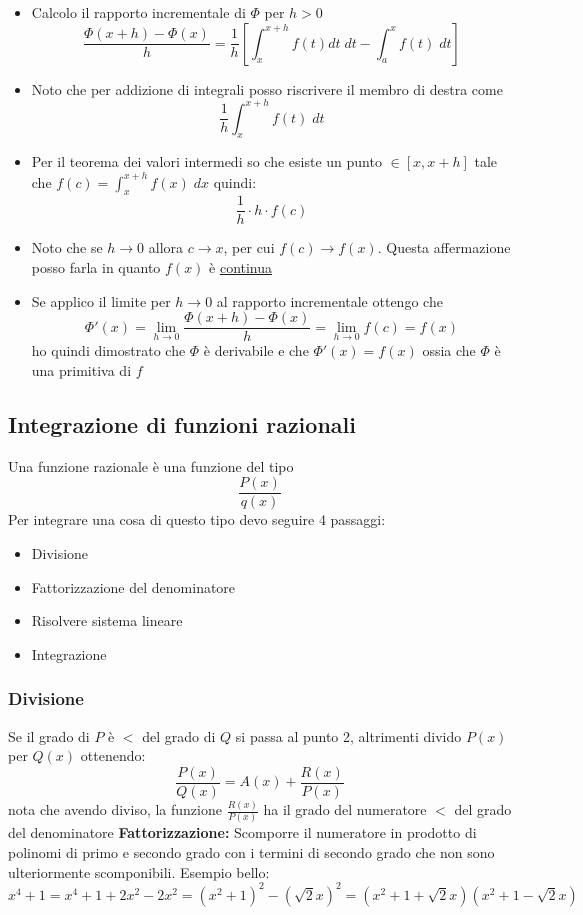 \begin{itemize}
	\item Calcolo il rapporto incrementale di $  \Phi  $ per $ h > 0  $
	      \[
		      \frac{\Phi \left( x+h \right) - \Phi \left( x \right) }{h}= \frac{1}{h}\left[ \int_{x}^{x+h} f\left( t \right) dt \; dt - \int_{a}^{x} f\left( t \right)  \; dt \right]
	      \]
	\item Noto che per addizione di integrali posso riscrivere il membro di destra come
	      \[
		      \frac{1}{h} \int_{x}^{x+h} f(t) \; dt
	      \]
	\item Per il teorema dei valori intermedi so che esiste un punto $ \in \left[ x, x+h \right]  $ tale che $  f\left( c \right) = \int_{x}^{x+h} f\left( x \right)  \; dx$ quindi:
	      \[
		      \frac{1}{h} \cdot h \cdot f\left( c \right)
	      \]
	\item Noto che se $ h \to 0 $ allora $  c \to x $, per cui $ f\left( c \right) \to f\left( x \right)  $. Questa affermazione posso farla in quanto $  f\left( x \right)  $ è \underline{continua}
	\item Se applico il limite per $ h \to 0 $ al rapporto incrementale ottengo che
	      \[
		      \Phi '\left( x \right) = \lim_{h \to 0} \frac{\Phi \left( x+h \right) -\Phi \left( x \right) }{h} = \lim_{h \to 0} f\left( c \right) = f\left( x \right)
	      \]
	      ho quindi dimostrato che $ \Phi  $ è derivabile e che $ \Phi '\left( x \right)  = f\left( x \right) $ ossia che $ \Phi  $ è una primitiva di $ f $
\end{itemize}
\subsection{Integrazione di funzioni razionali}
Una funzione razionale è una funzione del tipo
\[
	\frac{P\left( x \right) }{q\left( x \right) }
\]
Per integrare una cosa di questo tipo devo seguire 4 passaggi:
\begin{itemize}
	\item Divisione
	\item Fattorizzazione del denominatore
	\item Risolvere sistema lineare
	\item Integrazione
\end{itemize}
\subsubsection*{Divisione} Se il grado di $ P $ è $ < $ del grado di $ Q $ si passa al punto 2, altrimenti divido $ P\left( x \right)  $ per $  Q\left( x \right)  $ ottenendo:
\[
	\frac{P\left( x \right) }{Q\left( x \right) }= A\left( x \right) + \frac{R\left( x \right) }{P\left( x \right) }
\]
nota che avendo diviso, la funzione $ \frac{R\left( x \right)}{P\left( x \right) }  $ ha il grado del numeratore $ < $ del grado del denominatore
\vskip3mm
\textbf{Fattorizzazione:} Scomporre il numeratore in prodotto di polinomi di primo e secondo grado con i termini di secondo grado che non sono ulteriormente scomponibili. Esempio bello:
\[
	x^{4} + 1 = x^{4} + 1 + 2x^2 - 2x^2= \left( x^2 + 1 \right)^{2}- \left( \sqrt{2} x \right) ^2 = \left( x^2 + 1 + \sqrt{2} x \right) \left( x^2 + 1 - \sqrt{2} x \right)
\]
